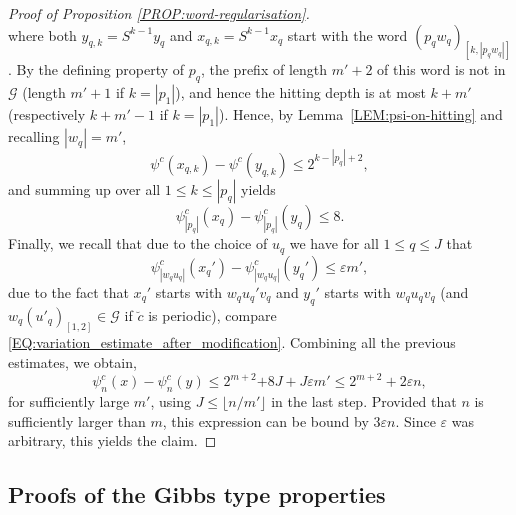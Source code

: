\documentclass[11pt,reqno]{amsart}
\theoremstyle{plain}
\theoremstyle{definition}
\newcommand{\mc}{\mathcal}
\begin{document}
\begin{proof}[Proof of Proposition \ref{PROP:word-regularisation}]
\[\] 
where both $y_{q,k} = S^{k-1} y_q$ and $x_{q,k}=S^{k-1} x_q$ start with the word $(p_q w_q)_{[k,|p_q w_q|]}$. By the defining property of $p_q$, the prefix of length $m'+2$ of this word is not in $\mc G$ (length $m'+1$ if $k=|p_1|$), and hence the hitting depth is at most $k + m'$ (respectively $k+m'-1$ if $k = |p_1|$). Hence, by Lemma~\ref{LEM:psi-on-hitting} and recalling $|w_q| = m'$,
\[
\psi^c(x_{q,k}) - \psi^c(y_{q,k}) \leqslant 2^{k - |p_q|  + 2 },
\]
and summing up over all $1 \leqslant k \leqslant |p_q|$ yields
\[
\psi^c_{|p_q|} (x_q) - \psi^c_{|p_q|}(y_q) \leqslant 8.
\]
Finally, we recall that due to the choice of $u_q$ we have for all $1\leqslant q \leqslant J$ that
\[
\psi^c_{|w_q u_q|} (x_q') - \psi^c_{|w_q u_q|} (y_q') \leqslant \varepsilon m',
\]
due to the fact that $x_q'$ starts with $w_q u_q' v_q$ and $y_q'$ starts with $w_q u_q v_q$ (and $w_q (u'_q)_{[1,2]} \in \mc G$ if $\breve{c}$ is periodic), compare \eqref{EQ:variation_estimate_after_modification}. 
Combining all the previous estimates, we obtain,
\[
\psi^c_n(x) - \psi^c_n(y)
\leqslant 2^{m+2}  {+ 8J} + J \varepsilon m' \leqslant  2^{m+2} + 2\varepsilon n,
\]
for sufficiently large $m'$,
using $J \leqslant \lfloor n / m' \rfloor$ in the last step. Provided that $n$ is sufficiently larger than $m$,
this expression can be bound by $3 \varepsilon n$. Since $\varepsilon$ was arbitrary, this yields the claim.
\end{proof}









\subsection{Proofs of the Gibbs type properties}\label{subsec: proofs gibbs type}
\end{document}
